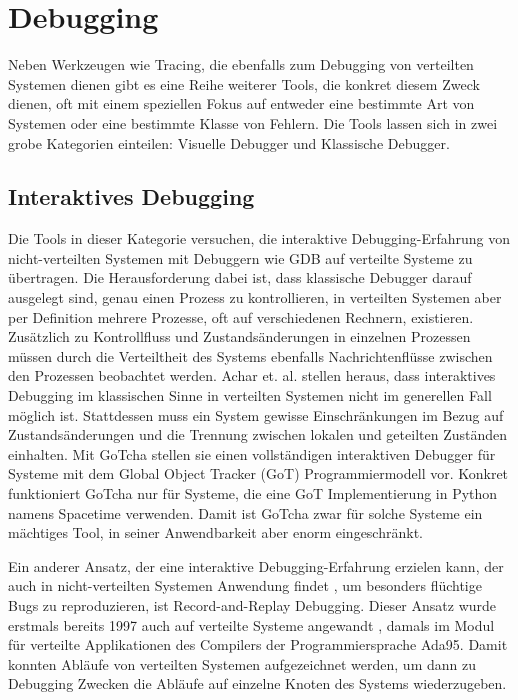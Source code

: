 \documentclass[12pt,a4paper]{report}
\begin{document}
\section{Debugging}
Neben Werkzeugen wie Tracing, die ebenfalls zum Debugging von verteilten Systemen dienen gibt es eine Reihe weiterer Tools, die
konkret diesem Zweck dienen, oft mit einem speziellen Fokus auf entweder eine bestimmte Art von Systemen oder eine bestimmte
Klasse von Fehlern. Die Tools lassen sich in zwei grobe Kategorien einteilen: Visuelle Debugger und Klassische Debugger.

\subsection{Interaktives Debugging}
Die Tools in dieser Kategorie versuchen, die interaktive Debugging-Erfahrung von nicht-verteilten Systemen mit Debuggern wie GDB auf verteilte
Systeme zu übertragen. Die Herausforderung dabei ist, dass klassische Debugger darauf ausgelegt sind, genau einen Prozess
zu kontrollieren, in verteilten Systemen aber per Definition mehrere Prozesse, oft auf verschiedenen Rechnern, existieren.
Zusätzlich zu Kontrollfluss und Zustandsänderungen in einzelnen Prozessen müssen durch die Verteiltheit des Systems ebenfalls
Nachrichtenflüsse zwischen den Prozessen beobachtet werden. Achar et. al. \cite{gotcha_interactive_debugger} stellen heraus, dass
interaktives Debugging im klassischen Sinne in verteilten Systemen nicht im generellen Fall möglich ist. Stattdessen muss ein
System gewisse Einschränkungen im Bezug auf Zustandsänderungen und die Trennung zwischen lokalen und geteilten Zuständen
einhalten. Mit GoTcha \cite{gotcha_interactive_debugger} stellen sie einen vollständigen interaktiven Debugger für Systeme mit dem
Global Object Tracker (GoT) Programmiermodell vor. Konkret funktioniert GoTcha nur für Systeme, die eine GoT Implementierung in
Python namens Spacetime verwenden. Damit ist GoTcha zwar für solche Systeme ein mächtiges Tool, in seiner Anwendbarkeit aber enorm
eingeschränkt.

Ein anderer Ansatz, der eine interaktive Debugging-Erfahrung erzielen kann, der auch in nicht-verteilten Systemen Anwendung findet
\cite{normal_record_and_replay}, um besonders flüchtige Bugs zu reproduzieren, ist Record-and-Replay Debugging. Dieser Ansatz
wurde erstmals bereits 1997 auch auf verteilte Systeme angewandt \cite{distributed_replay_debugging_1997}, damals im Modul für
verteilte Applikationen des Compilers der Programmiersprache Ada95. Damit konnten Abläufe von verteilten Systemen aufgezeichnet
werden, um dann zu Debugging Zwecken die Abläufe auf einzelne Knoten des Systems wiederzugeben.
\end{document}
